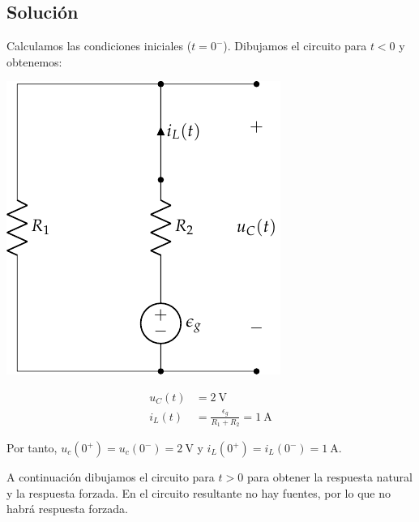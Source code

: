 \subsection*{Solución}

Calculamos las condiciones iniciales ($t = 0^-$). Dibujamos el
circuito para $t < 0$ y obtenemos:

\bigskip

\begin{minipage}{0.3\textwidth}
  \includegraphics[scale=0.8]{figuras/FM_4_9_t0-}
\end{minipage}
\begin{minipage}{0.7\textwidth}
  \begin{align*}
    u_C(t) &= \SI{2}{\volt}\\
    i_L(t) &= \frac{\epsilon_g}{R_1 + R_2} = \SI{1}{\ampere}
  \end{align*}
\end{minipage}

\bigskip Por tanto, $u_c(0^+) = u_c(0^-) = \SI{2}{\volt}$ y
$i_L(0^+) = i_L(0^-) = \SI{1}{\ampere}$.

A continuación dibujamos el circuito para $t > 0$ para obtener la
respuesta natural y la respuesta forzada. En el circuito resultante no
hay fuentes, por lo que no habrá respuesta forzada.

\bigskip

